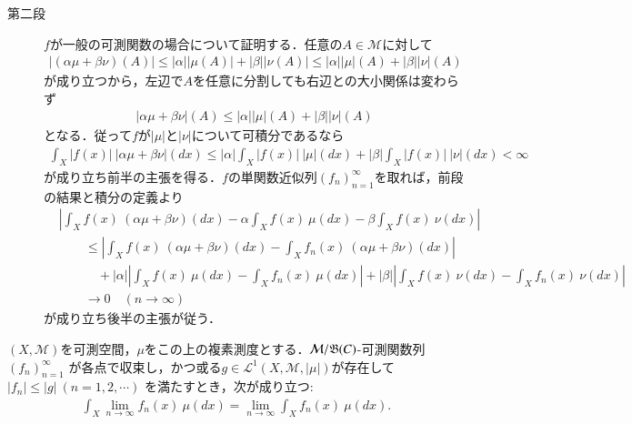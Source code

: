 \begin{prf}
\begin{description}
			\item[第二段]
			$f$が一般の可測関数の場合について証明する．任意の$A \in \mathcal{M}$に対して
			\begin{align}
				\left| (\alpha \mu + \beta \nu)(A) \right| \leq |\alpha||\mu(A)| + |\beta||\nu(A)| \leq |\alpha||\mu|(A) + |\beta||\nu|(A)
 			\end{align}
 			が成り立つから，左辺で$A$を任意に分割しても右辺との大小関係は変わらず
 			\begin{align}
 				|\alpha \mu + \beta \nu|(A) \leq |\alpha||\mu|(A) + |\beta||\nu|(A)
 			\end{align}
 			となる．従って$f$が$|\mu|$と$|\nu|$について可積分であるなら
 			\begin{align}
 				\int_X |f(x)|\ |\alpha \mu + \beta \nu|(dx) \leq |\alpha| \int_X |f(x)|\ |\mu|(dx) + |\beta| \int_X |f(x)|\ |\nu|(dx) < \infty
 			\end{align}
 			が成り立ち前半の主張を得る．$f$の単関数近似列$(f_n)_{n=1}^{\infty}$を取れば，前段の結果と積分の定義より
 			\begin{align}
 				&\left| \int_X f(x)\ (\alpha\mu + \beta\nu)(dx) - \alpha \int_X f(x)\ \mu(dx) - \beta \int_X f(x)\ \nu(dx) \right| \\
 					&\qquad \leq \left| \int_X f(x)\ (\alpha\mu + \beta\nu)(dx) - \int_X f_n(x)\ (\alpha\mu + \beta\nu)(dx) \right| \\
 					&\qquad \quad + |\alpha| \left| \int_X f(x)\ \mu(dx) - \int_X f_n(x)\ \mu(dx) \right|
 					+ |\beta| \left| \int_X f(x)\ \nu(dx) - \int_X f_n(x)\ \nu(dx) \right| \\
 				&\qquad \longrightarrow 0 \quad (n \longrightarrow \infty)
 			\end{align}
 			が成り立ち後半の主張が従う．
 			\QED
		\end{description}
	\end{prf}
	
	\begin{screen}
		\begin{thm}[収束定理]
			$(X,\mathcal{M})$を可測空間，$\mu$をこの上の複素測度とする．$\mathcal{M}/\mathfrak{B}(C)$-可測関数列$(f_n)_{n=1}^{\infty}$
			が各点で収束し，かつ或る$g \in \mathscr{L}^1(X,\mathcal{M},|\mu|)$が存在して$|f_n| \leq |g|\ (n=1,2,\cdots)$
			を満たすとき，次が成り立つ:
			\begin{align}
				\int_X\lim_{n \to \infty} f_n(x)\ \mu(dx) = \lim_{n \to \infty} \int_X f_n(x)\ \mu(dx).
			\end{align}
			\label{eq:lebesgue_convergence_theorem_complex_measure}
		\end{thm}
	\end{screen}
	
